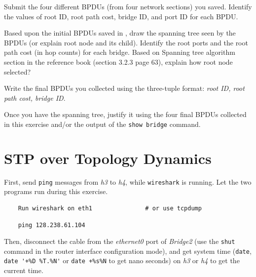 \documentclass{UTNetLab}
\begin{document}
    \begin{report}
    \item Submit the four different BPDUs (from four network sections) you saved. Identify the values of root ID, root path cost, bridge ID, and port ID for each BPDU.
    
   \item Based upon the initial BPDUs saved in , draw the spanning tree seen by the BPDUs (or explain root node and its child).
    Identify the root ports and the root path cost (in hop counts) for each bridge.
    Based on Spanning tree algorithm section in the reference book (section 3.2.3 page 63), explain how root node selected?

    \item Write the final BPDUs you collected using the three-tuple format: \textit{{root ID, root path cost, bridge ID}}.  

    \item Once you have the spanning tree, justify it using the four final BPDUs collected in this exercise and/or the output of the \lstinline[language={cisco}]{show bridge} command.
    
    \end{report}

\section{STP over Topology Dynamics}
    First, send \lstinline{ping} messages from \textit{h3} to \textit{h4}, while \lstinline{wireshark} is running.
    Let the two programs run during this exercise.
          
    \begin{lstlisting}
    Run wireshark on eth1               # or use tcpdump
    \end{lstlisting}
    
    \begin{lstlisting}
    ping 128.238.61.104
    \end{lstlisting}

    Then, disconnect the cable from the \textit{ethernet0} port of \textit{Bridge2} (use the \lstinline{shut} command in the router interface configuration mode), and get system time (\lstinline{date}, \lstinline{date '+%D %T.%N'} or \lstinline{date +%s%N} to get nano seconds) on \textit{h3} or \textit{h4} to get the current time.
  
\end{document}
